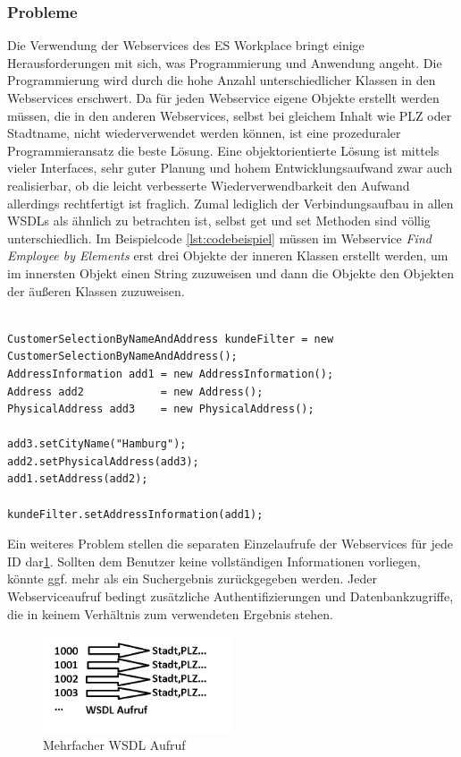 \subsubsection{Probleme}

Die Verwendung der Webservices des ES Workplace bringt einige Herausforderungen mit sich, was Programmierung und Anwendung
angeht. Die Programmierung wird durch die hohe Anzahl unterschiedlicher Klassen in den Webservices erschwert. Da für jeden
Webservice eigene Objekte erstellt werden müssen, die in den anderen Webservices, selbst bei gleichem Inhalt wie PLZ oder
Stadtname, nicht wiederverwendet werden können, ist eine prozeduraler Programmieransatz die beste Lösung. Eine objektorientierte 
Lösung ist mittels vieler Interfaces, sehr guter Planung und hohem Entwicklungsaufwand zwar auch realisierbar, ob die leicht 
verbesserte Wiederverwendbarkeit den Aufwand allerdings rechtfertigt ist fraglich. Zumal lediglich der Verbindungsaufbau in allen
WSDLs als ähnlich zu betrachten ist, selbst get und set Methoden sind völlig unterschiedlich. Im Beispielcode \ref{lst:codebeispiel}
müssen im Webservice \emph{Find Employee by Elements} erst drei Objekte der inneren Klassen erstellt werden, um im  innersten Objekt 
einen String zuzuweisen und dann die Objekte den Objekten der äußeren Klassen zuzuweisen.

\begin{lstlisting}[float=h!t]

CustomerSelectionByNameAndAddress kundeFilter = new CustomerSelectionByNameAndAddress();
AddressInformation add1 = new AddressInformation();
Address add2            = new Address();
PhysicalAddress add3    = new PhysicalAddress();

add3.setCityName("Hamburg");
add2.setPhysicalAddress(add3);
add1.setAddress(add2);

kundeFilter.setAddressInformation(add1);

\end{lstlisting} 


Ein weiteres Problem stellen die separaten Einzelaufrufe der Webservices für jede ID dar\ref{fig:sapbild1}. Sollten dem Benutzer keine
vollständigen Informationen vorliegen, könnte ggf. mehr als ein Suchergebnis zurückgegeben werden. Jeder Webserviceaufruf bedingt 
zusätzliche Authentifizierungen und Datenbankzugriffe, die in keinem Verhältnis zum verwendeten Ergebnis stehen.
\begin{figure}[h!t]
\begin{center}
\includegraphics[width=0.5\textwidth]{Bilder/presi1.png}
\end{center}
\caption{Mehrfacher WSDL Aufruf}
\label{fig:sapbild1} 
\end{figure}

